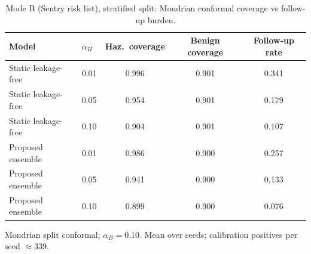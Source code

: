\begin{table}[t]
\centering
\small
\caption{Mode B (Sentry risk list), stratified split: Mondrian conformal coverage vs follow-up burden.}
\label{tab:conf_sentry_stratified}
\begin{tabular}{llccc}
\toprule
Model & $\alpha_H$ & Haz.\ coverage & Benign coverage & Follow-up rate \\
\midrule
Static leakage-free & 0.01 & 0.996 & 0.901 & 0.341 \\
Static leakage-free & 0.05 & 0.954 & 0.901 & 0.179 \\
Static leakage-free & 0.10 & 0.904 & 0.901 & 0.107 \\
\midrule
Proposed ensemble & 0.01 & 0.986 & 0.900 & 0.257 \\
Proposed ensemble & 0.05 & 0.941 & 0.900 & 0.133 \\
Proposed ensemble & 0.10 & 0.899 & 0.900 & 0.076 \\
\bottomrule
\end{tabular}
\par\vspace{2pt}\footnotesize Mondrian split conformal; $\alpha_B=0.10$. Mean over seeds; calibration positives per seed $\approx 339$.
\end{table}

